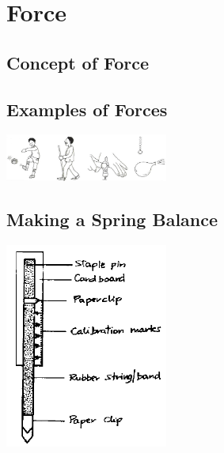 \section{Force}

\begin{multicols}{2}

\section*{Concept of Force}


\subsection{Examples of Forces}
\begin{center}
\includegraphics[width=0.4\textwidth]{./img/vso/forces-ex.png}
\end{center}

\subsection{Making a Spring Balance}

\begin{center}
\includegraphics[width=0.4\textwidth]{./img/source/spring-balance.png}
\end{center}


\end{multicols}
